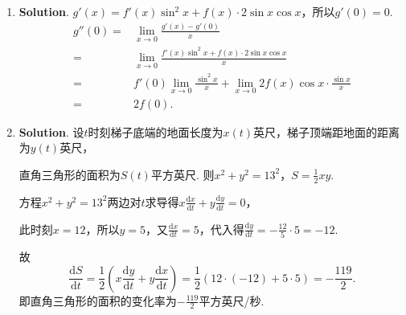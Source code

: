 \documentclass[../main.tex]{subfiles}
\begin{document}
\begin{enumerate}
    \item \textbf{Solution}. $g'(x)=f'(x)\sin^{2} x+f(x)\cdot 2\sin x\cos x$，所以$g
              '(0)=0$.
          \[
              \begin{aligned}
                  g''(0) = {} & \lim_{x\to0}\frac{g'(x)-g'(0)}{x}                                                 \\
                  = {}        & \lim_{x\to0}\frac{f'(x)\sin^2 x+f(x)\cdot 2\sin x\cos x}{x}                       \\
                  = {}        & f'(0)\lim_{x\to0}\frac{\sin^2 x}{x}+\lim_{x\to 0}2f(x)\cos x\cdot\frac{\sin x}{x} \\
                  = {}        & 2f(0).
              \end{aligned}
          \]

    \item \textbf{Solution}. 设$t$时刻梯子底端的地面长度为$x(t)$英尺，梯子顶端距地面的距离为$y
              (t)$英尺，

          直角三角形的面积为$S(t)$平方英尺. 则$x^{2}+y^{2}=13^{2}$，$S=\frac{1}{2}xy$.

          方程$x^{2}+y^{2}=13^{2}$两边对$t$求导得$x\frac{\mathrm{d}x}{\mathrm{d}t}+y\frac{\mathrm{d}y}{\mathrm{d}t}
              =0$，

          此时刻$x=12$，所以$y=5$，又$\frac{\mathrm{d}x}{\mathrm{d}t}=5$，代入得$\frac{\mathrm{d}y}{\mathrm{d}t}
              =-\frac{12}{5}\cdot 5=-12$.

          故
          \[
              \frac{\mathrm{d}S}{\mathrm{d}t}=\frac{1}{2}\left(x\frac{\mathrm{d}y}{\mathrm{d}t}
              +y\frac{\mathrm{d}x}{\mathrm{d}t}\right)=\frac{1}{2}(12\cdot(-12)+5\cdot 5)
              =-\frac{119}{2}.
          \]
          即直角三角形的面积的变化率为$-\frac{119}{2}$平方英尺/秒.
\end{enumerate}
\end{document}
